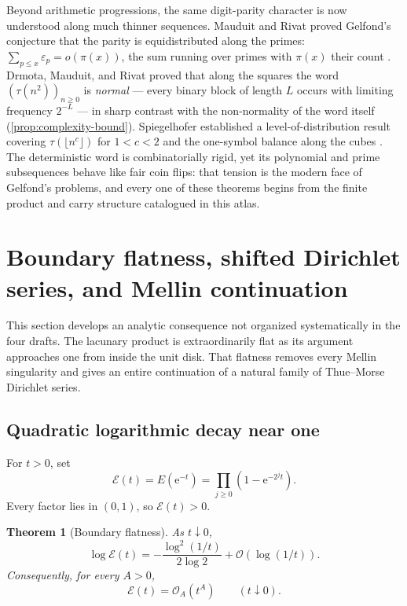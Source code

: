 \documentclass[11pt,oneside]{article}
\numberwithin{equation}{section}
\newtheorem{theorem}{Theorem}[section]
\theoremstyle{definition}
\theoremstyle{remark}
\newcommand{\e}{\mathrm e}
\newcommand{\bigO}{\mathcal O}
\newcommand{\smallo}{o}
\newcommand{\eps}{\varepsilon}
\begin{document}
Beyond arithmetic progressions, the same digit-parity character is now
understood along much thinner sequences.  Mauduit and Rivat proved
Gelfond's conjecture that the parity is equidistributed along the primes:
\(\sum_{p\le x}\eps_p=\smallo(\pi(x))\), the sum running over primes with
\(\pi(x)\) their count \cite{mauduitRivat2010}.  Drmota, Mauduit, and Rivat
proved that along the squares the word
\((\tau(n^2))_{n\ge0}\) is \emph{normal} --- every binary block of length
\(L\) occurs with limiting frequency \(2^{-L}\)
\cite{drmotaMauduitRivat2019} --- in sharp contrast with the non-normality
of the word itself (\cref{prop:complexity-bound}).  Spiegelhofer
established a level-of-distribution result covering
\(\tau(\lfloor n^c\rfloor)\) for \(1<c<2\) \cite{spiegelhofer2020} and the
one-symbol balance along the cubes \cite{spiegelhofer2023}.  The
deterministic word is combinatorially rigid, yet its polynomial and prime
subsequences behave like fair coin flips: that tension is the modern face
of Gelfond's problems, and every one of these theorems begins from the
finite product and carry structure catalogued in this atlas.

\section[Mellin--Dirichlet continuation]{Boundary flatness, shifted Dirichlet series, and Mellin continuation}
\label{sec:dirichlet-mellin}

This section develops an analytic consequence not organized systematically in
the four drafts.  The lacunary product is extraordinarily flat as its argument
approaches one from inside the unit disk.  That flatness removes every Mellin
singularity and gives an entire continuation of a natural family of
Thue--Morse Dirichlet series.

\subsection{Quadratic logarithmic decay near one}

For \(t>0\), set
\begin{equation}
  \mathcal E(t)=E(\e^{-t})
  =\prod_{j\ge0}(1-\e^{-2^jt}).
  \label{eq:E-caligraphic}
\end{equation}
Every factor lies in \((0,1)\), so \(\mathcal E(t)>0\).

\begin{theorem}[Boundary flatness]
\label{thm:boundary-flatness}
As \(t\downarrow0\),
\begin{equation}
  \boxed{
  \log\mathcal E(t)
  =-\frac{\log^2(1/t)}{2\log2}
   +\bigO(\log(1/t)).}
  \label{eq:boundary-log-asymptotic}
\end{equation}
Consequently, for every \(A>0\),
\begin{equation}
  \mathcal E(t)=\bigO_A(t^A)
  \qquad(t\downarrow0).
  \label{eq:superpolynomial-flatness}
\end{equation}
\end{theorem}
\end{document}

